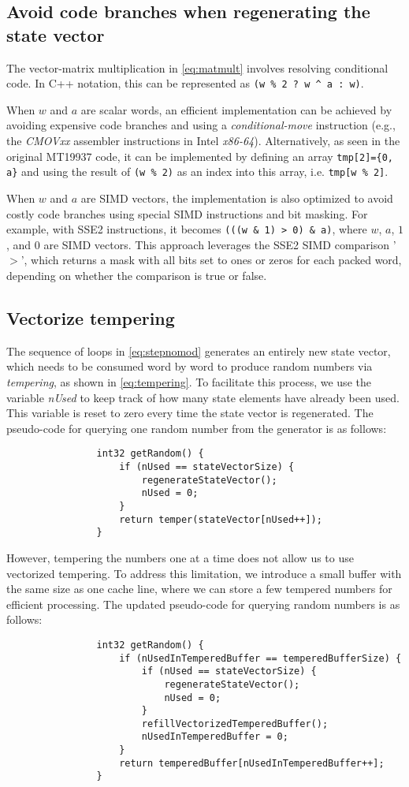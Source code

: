 \documentclass[preprint,1p,times]{elsarticle}
\begin{document}
	\subsection{Avoid code branches when regenerating the state vector}
	The vector-matrix multiplication in \eqref{eq:matmult} involves resolving conditional code. In C++ notation, this can be represented as \lstinline{(w % 2 ? w ^ a : w)}.
		
		When $w$ and $a$ are scalar words, an efficient implementation can be achieved by avoiding expensive code branches and using a \textit{conditional-move} instruction (e.g., the \textit{CMOVxx} assembler instructions in Intel \textit{x86-64}). Alternatively, as seen in the original MT19937 code, it can be implemented by defining an array \lstinline|tmp[2]={0, a}| and using the result of \lstinline{(w % 2)} as an index into this array, i.e. \lstinline{tmp[w % 2]}.
			
			When $w$ and $a$ are SIMD vectors, the implementation is also optimized to avoid costly code branches using special SIMD instructions and bit masking. For example, with SSE2 instructions, it becomes \lstinline{(((w & 1) > 0) & a)}, where $w$, $a$, $1$, and $0$ are SIMD vectors. This approach leverages the SSE2 SIMD comparison '$>$', which returns a mask with all bits set to ones or zeros for each packed word, depending on whether the comparison is true or false.
			
			\subsection{Vectorize tempering}
			The sequence of loops in \eqref{eq:stepnomod} generates an entirely new state vector, which needs to be consumed word by word to produce random numbers via \textit{tempering}, as shown in \eqref{eq:tempering}. To facilitate this process, we use the variable \textit{nUsed} to keep track of how many state elements have already been used. This variable is reset to zero every time the state vector is regenerated. The pseudo-code for querying one random number from the generator is as follows:
			\begin{verbatim}
				int32 getRandom() {
					if (nUsed == stateVectorSize) {
						regenerateStateVector();
						nUsed = 0;
					}
					return temper(stateVector[nUsed++]);
				}
			\end{verbatim}
			However, tempering the numbers one at a time does not allow us to use vectorized tempering. To address this limitation, we introduce a small buffer with the same size as one cache line, where we can store a few tempered numbers for efficient processing. The updated pseudo-code for querying random numbers is as follows:
			\begin{verbatim}
				int32 getRandom() {
					if (nUsedInTemperedBuffer == temperedBufferSize) {
						if (nUsed == stateVectorSize) {
							regenerateStateVector();
							nUsed = 0;
						}
						refillVectorizedTemperedBuffer();
						nUsedInTemperedBuffer = 0;
					}
					return temperedBuffer[nUsedInTemperedBuffer++];
				}
			\end{verbatim}
\end{document}
